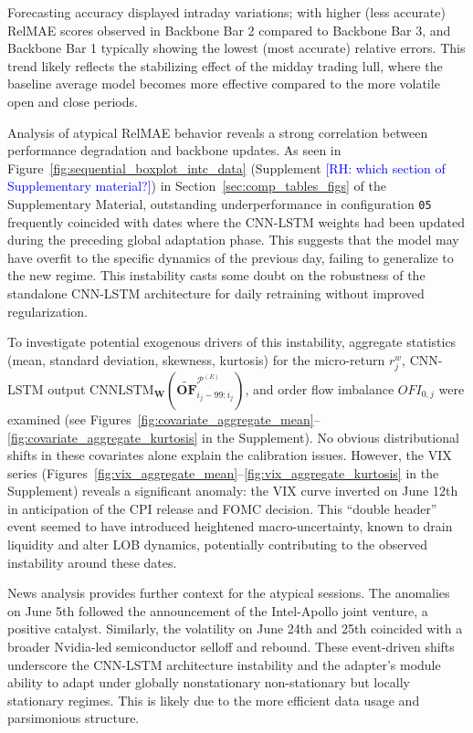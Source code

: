 \documentclass[10pt,a4paper,oneside]{article}
\newcommand{\rh}[1]{\textcolor{blue}{\textsf{[RH: #1]}}}
\providecommand{\DIFaddtex}[1]{{\protect\color{blue} \sf #1}} %
\providecommand{\DIFdeltex}[1]{{\protect\color{red} \scriptsize #1}} %
\providecommand{\DIFaddbegin}{} %
\providecommand{\DIFaddend}{} %
\providecommand{\DIFdelbegin}{} %
\providecommand{\DIFdelend}{} %
\providecommand{\DIFadd}[1]{\texorpdfstring{\DIFaddtex{#1}}{#1}} %
\providecommand{\DIFdel}[1]{\texorpdfstring{\DIFdeltex{#1}}{}} %
\newcommand{\DIFscaledelfig}{0.5}
\newlength{\DIFdelgraphicswidth} %
\newlength{\DIFdelgraphicsheight} %
\newcommand{\DIFaddincludegraphics}[2][]{{\color{blue}\fbox{\DIFOincludegraphics[#1]{#2}}}} %
\newcommand{\DIFdelincludegraphics}[2][]{%
\sbox{\DIFdelgraphicsbox}{\DIFOincludegraphics[#1]{#2}}%
\settoboxwidth{\DIFdelgraphicswidth}{\DIFdelgraphicsbox} %
\settoboxtotalheight{\DIFdelgraphicsheight}{\DIFdelgraphicsbox} %
\scalebox{\DIFscaledelfig}{%
\parbox[b]{\DIFdelgraphicswidth}{\usebox{\DIFdelgraphicsbox}\\[-\baselineskip] \rule{\DIFdelgraphicswidth}{0em}}\llap{\resizebox{\DIFdelgraphicswidth}{\DIFdelgraphicsheight}{%
\setlength{\unitlength}{\DIFdelgraphicswidth}%
\begin{picture}(1,1)%
\thicklines\linethickness{2pt} %
{\color[rgb]{1,0,0}\put(0,0){\framebox(1,1){}}}%
{\color[rgb]{1,0,0}\put(0,0){\line( 1,1){1}}}%
{\color[rgb]{1,0,0}\put(0,1){\line(1,-1){1}}}%
\end{picture}%
}\hspace*{3pt}}} %
} %
\DeclareRobustCommand{\DIFaddbegin}{\DIFOaddbegin \let\includegraphics\DIFaddincludegraphics} %
\DeclareRobustCommand{\DIFaddend}{\DIFOaddend \let\includegraphics\DIFOincludegraphics} %
\DeclareRobustCommand{\DIFdelbegin}{\DIFOdelbegin \let\includegraphics\DIFdelincludegraphics} %
\DeclareRobustCommand{\DIFdelend}{\DIFOaddend \let\includegraphics\DIFOincludegraphics} %
\begin{document}
Forecasting accuracy displayed intraday variations; with higher (less accurate) RelMAE scores observed in Backbone Bar 2 compared to Backbone Bar 3, and Backbone Bar 1 typically showing the lowest (most accurate) relative errors. This trend likely reflects the stabilizing effect of the midday trading lull, where the baseline average model becomes more effective compared to the more volatile open and close periods.

Analysis of atypical RelMAE behavior reveals a strong correlation between performance degradation and backbone updates. As seen in Figure~\ref{fig:sequential_boxplot_intc_data} \DIFdelbegin \DIFdel{(Supplement \rh{which section of Supplementary material?})}\DIFdelend \DIFaddbegin \DIFadd{in Section~\ref{sec:comp_tables_figs} of the Supplementary Material}\DIFaddend , outstanding underperformance in configuration \texttt{05} frequently coincided with dates where the CNN-LSTM weights had been updated during the preceding global adaptation phase. This suggests that the model may have overfit to the specific dynamics of the previous day, failing to generalize to the new regime. This instability casts some doubt on the robustness of the standalone CNN-LSTM architecture for daily retraining without improved regularization.

To investigate potential exogenous drivers of this instability, aggregate statistics (mean, standard deviation, skewness, kurtosis) for the micro-return $r^w_j$, CNN-LSTM output $\mathrm{CNNLSTM}_{\mathbf{W}}\!\left(\widetilde{\mathbf{OF}}^{\mathcal{P}^{(E)}}_{i_{j}-99:i_{j}}\right)$, and order flow imbalance $OFI_{0, j}$ were examined (see Figures~\ref{fig:covariate_aggregate_mean}--\ref{fig:covariate_aggregate_kurtosis} in the Supplement). No obvious distributional shifts in these covariates alone explain the calibration issues. However, the VIX series (Figures~\ref{fig:vix_aggregate_mean}--\ref{fig:vix_aggregate_kurtosis} in the Supplement) reveals a significant anomaly: the VIX curve inverted on June 12th in anticipation of the CPI release and FOMC decision. This ``double header'' event seemed to have introduced heightened macro-uncertainty, known to drain liquidity and alter LOB dynamics, potentially contributing to the observed instability around these dates.

News analysis provides further context for the atypical sessions. The anomalies on June 5th followed the announcement of the Intel-Apollo joint venture, a positive catalyst. Similarly, the volatility on June 24th and 25th coincided with a broader Nvidia-led semiconductor selloff and rebound. These event-driven shifts underscore the CNN-LSTM architecture instability and the adapter's module ability to adapt under globally \DIFdelbegin \DIFdel{nonstationary }\DIFdelend \DIFaddbegin \DIFadd{non-stationary }\DIFaddend but locally stationary regimes. This is likely due to the more efficient data usage and parsimonious structure.
\end{document}

